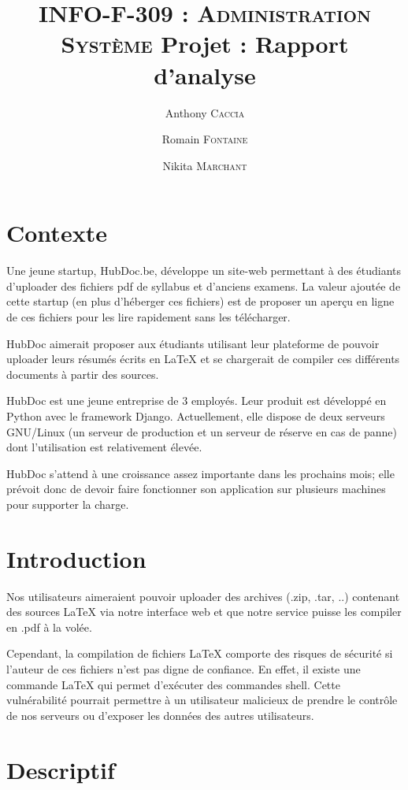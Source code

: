 \documentclass[10pt,a4paper]{article}
\author{Anthony \textsc{Caccia} \and Romain \textsc{Fontaine} \and Nikita \textsc{Marchant} }
\date{}
\title{\textsc{INFO-F-309 : Administration Système} Projet : Rapport d'analyse}
\begin{document}
\maketitle

\section{Contexte}

Une jeune startup, HubDoc.be, développe un site-web permettant à des étudiants d'uploader des fichiers pdf de syllabus et d'anciens examens.
La valeur ajoutée de cette startup (en plus d'héberger ces fichiers) est de proposer un aperçu en ligne de ces fichiers pour les lire rapidement sans les télécharger.

HubDoc aimerait proposer aux étudiants utilisant leur plateforme de pouvoir uploader leurs résumés écrits en \LaTeX { }et se chargerait de compiler ces différents documents à partir des sources.

HubDoc est une jeune entreprise de 3 employés.
Leur produit est développé en Python avec le framework Django.
Actuellement, elle dispose de deux serveurs GNU/Linux (un serveur de production et un serveur de réserve en cas de panne) dont l'utilisation est relativement élevée.

HubDoc s'attend à une croissance assez importante dans les prochains mois;
elle prévoit donc de devoir faire fonctionner son application sur plusieurs machines pour supporter la charge.


\section{Introduction}

Nos utilisateurs aimeraient pouvoir uploader des archives (.zip, .tar, ..) contenant des sources \LaTeX { }via notre interface web et que notre service puisse les compiler en .pdf à la volée.

Cependant, la compilation de fichiers \LaTeX { }comporte des risques de sécurité si l'auteur de ces fichiers n'est pas digne de confiance.
En effet, il existe une commande \LaTeX { }qui permet d'exécuter des commandes shell.
Cette vulnérabilité pourrait permettre à un utilisateur malicieux de prendre le contrôle de nos serveurs ou d'exposer les données des autres utilisateurs.

\section{Descriptif}
\end{document}
